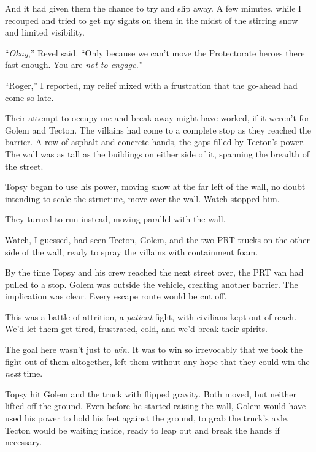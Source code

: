 And it had given them the chance to try and slip away.  A few minutes, while I recouped and tried to get my sights on them in the midst of the stirring snow and limited visibility.



``\emph{Okay},'' Revel said.  ``Only because we can't move the Protectorate heroes there fast enough.  You are \emph{not to engage.''}



``Roger,'' I reported, my relief mixed with a frustration that the go-ahead had come so late.



Their attempt to occupy me and break away might have worked, if it weren't for Golem and Tecton.  The villains had come to a complete stop as they reached the barrier.  A row of asphalt and concrete hands, the gaps filled by Tecton's power.  The wall was as tall as the buildings on either side of it, spanning the breadth of the street.



Topsy began to use his power, moving snow at the far left of the wall, no doubt intending to scale the structure, move over the wall.  Watch stopped him.



They turned to run instead, moving parallel with the wall.



Watch, I guessed, had seen Tecton, Golem, and the two PRT trucks on the other side of the wall, ready to spray the villains with containment foam.



By the time Topsy and his crew reached the next street over, the PRT van had pulled to a stop.  Golem was outside the vehicle, creating another barrier.  The implication was clear.  Every escape route would be cut off.



This was a battle of attrition, a \emph{patient }fight, with civilians kept out of reach.  We'd let them get tired, frustrated, cold, and we'd break their spirits.



The goal here wasn't just to \emph{win}.  It was to win so irrevocably that we took the fight out of them altogether, left them without any hope that they could win the \emph{next} time.



Topsy hit Golem and the truck with flipped gravity.  Both moved, but neither lifted off the ground.  Even before he started raising the wall, Golem would have used his power to hold his feet against the ground, to grab the truck's axle.  Tecton would be waiting inside, ready to leap out and break the hands if necessary.



